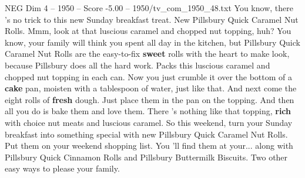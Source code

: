 \begin{textsample}{NEG Dim 4 – 1950 – Score -5.00 – 1950/tv\_com\_1950\_48.txt}  \label{ex:f4_neg_004}
You know, there 's no trick to this new Sunday breakfast treat.
New Pillsbury Quick Caramel Nut Rolls.
Mmm, look at that luscious caramel and chopped nut topping, huh?
You know, your family will think you spent all day in the kitchen, but Pillsbury Quick Caramel Nut Rolls are the easy-to-fix \textbf{sweet} rolls with the heart to make look, because Pillsbury does all the hard work.
Packs this luscious caramel and chopped nut topping in each can.
Now you just crumble it over the bottom of a \textbf{cake} pan, moisten with a tablespoon of water, just like that.
And next come the eight rolls of \textbf{fresh} dough.
Just place them in the pan on the topping.
And then all you do is bake them and love them.
There 's nothing like that topping, \textbf{rich} with choice nut meats and luscious caramel.
So this weekend, turn your Sunday breakfast into something special with new Pillsbury Quick Caramel Nut Rolls.
Put them on your weekend shopping list.
You 'll find them at your... along with Pillsbury Quick Cinnamon Rolls and Pillsbury Buttermilk Biscuits.
Two other easy ways to please your family.

\end{textsample}
